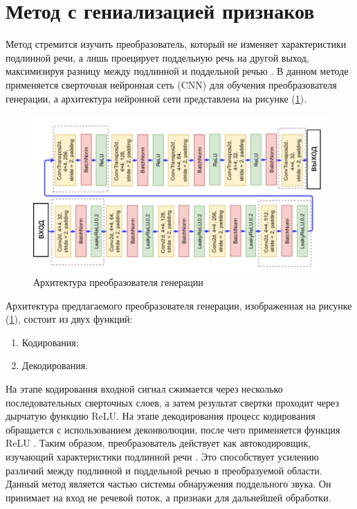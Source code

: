 

\section{Метод с гениализацией признаков}

Метод стремится изучить преобразователь, который не изменяет характеристики подлинной речи, а лишь проецирует поддельную речь на другой выход, максимизируя разницу между подлинной и поддельной речью \cite{wu2020light}. В данном методе применяется сверточная нейронная сеть (CNN) для обучения преобразователя генерации, а архитектура нейронной сети представлена на рисунке (\ref{fig:cnn-arch}).

\begin{figure}[H]
	\centering
	\includegraphics[width=1\linewidth]{images/cnn-arch.png}
	\caption{Архитектура преобразователя генерации}
	\label{fig:cnn-arch}
\end{figure}

Архитектура предлагаемого преобразователя генерации, изображенная на рисунке (\ref{fig:cnn-arch}), состоит из двух функций:
\begin{enumerate}
    \item Кодирования;
    \item Декодирования.
\end{enumerate}

На этапе кодирования входной сигнал сжимается через несколько последовательных сверточных слоев, а затем результат свертки проходит через дырчатую функцию ReLU. На этапе декодирования процесс кодирования обращается с использованием деконволюции, после чего применяется функция ReLU \cite{wu2020light}. Таким образом, преобразователь действует как автокодировщик, изучающий характеристики подлинной речи \cite{gehring2013extracting}. Это способствует усилению различий между подлинной и поддельной речью в преобразуемой области.\\
Данный метод является частью системы обнаружения поддельного звука. Он принимает на вход не речевой поток, а признаки для дальнейшей обработки.

